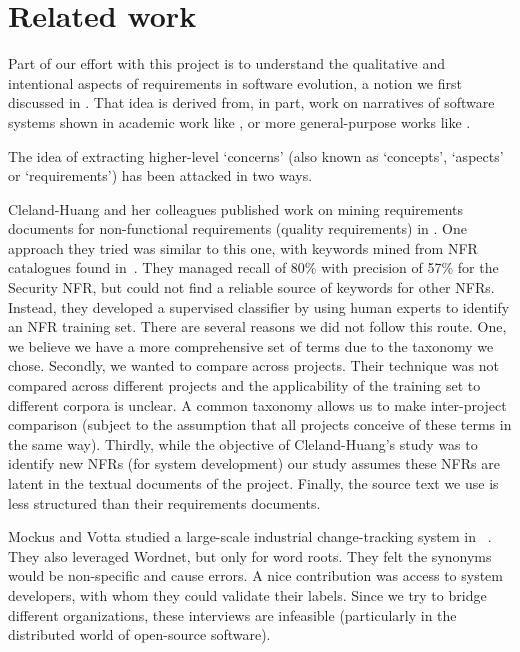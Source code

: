 \documentclass{acm_proc_article-sp}
\begin{document}
\section{Related work}

Part of our effort with this project is to understand the qualitative and intentional aspects of requirements in software evolution, a notion we first discussed in \cite{ernst07icsm}. That idea is derived from, in part, work on narratives of software systems shown in academic work like \cite{anton01}, or more general-purpose works like \cite{waldo93}.

The idea of extracting higher-level `concerns' (also known as `concepts', `aspects' or `requirements') has been attacked in two ways.

Cleland-Huang and her colleagues published work on mining requirements documents for non-functional requirements (quality requirements) in \cite{Cleland-Huang2006}. One approach they tried was similar to this one, with keywords mined from NFR catalogues found in~\cite{chung99}. They managed recall of 80\% with precision of 57\% for the Security NFR, but could not find a reliable source of keywords for other NFRs. Instead, they developed a supervised classifier by using human experts to identify an NFR training set. There are several reasons we did not follow this route. One, we believe we have a more comprehensive set of terms due to the taxonomy we chose. Secondly, we wanted to compare across projects. Their technique was not compared across different projects and the applicability of the training set to different corpora is unclear. A common taxonomy allows us to make inter-project comparison (subject to the assumption that all projects conceive of these terms in the same way). Thirdly, while the objective of Cleland-Huang's study was to identify new NFRs (for system development) our study assumes these NFRs are latent in the textual documents of the project. Finally, the source text we use is less structured than their requirements documents.

Mockus and Votta studied a large-scale industrial change-tracking system in ~\cite{Mockus00}. They also leveraged Wordnet, but only for word roots. They felt the synonyms would be non-specific and cause errors. A nice contribution was access to system developers, with whom they could validate their labels. Since we try to bridge different organizations, these interviews are infeasible (particularly in the distributed world of open-source software).
\end{document}
